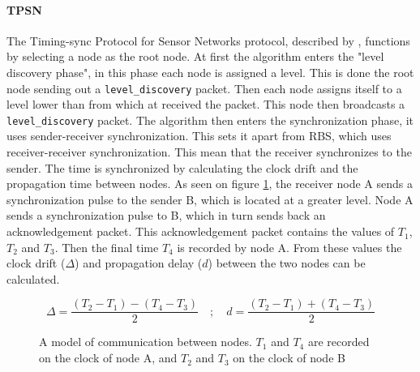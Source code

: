 \documentclass[a4paper,12pt]{article}
\begin{document}
    \paragraph{TPSN} The Timing-sync Protocol for Sensor Networks protocol, described by \citet{GaneriwalEtAl03}, functions by selecting a node as the root node. At first the algorithm enters the "level discovery phase", in this  phase each node is assigned a level. This is done the root node sending out a \texttt{level\_discovery} packet. Then each node assigns itself to a level lower than from which at received the packet. This node then broadcasts a \texttt{level\_discovery} packet. The algorithm then enters the synchronization phase, it uses sender-receiver synchronization. This sets it apart from RBS, which uses receiver-receiver synchronization. This mean that the receiver synchronizes to the sender. The time is synchronized by calculating the clock drift and the propagation time between nodes. As seen on figure \ref{timemeasuretpsn}, the receiver node A sends a synchronization pulse to the sender B, which is located at a greater level. Node A sends a synchronization pulse to B, which in turn sends back an acknowledgement packet. This acknowledgement packet contains the values of $T_1$, $T_2$ and $T_3$. Then the final time $T_4$ is recorded by node A. From these values the clock drift ($\Delta$) and propagation delay ($d$) between the two nodes can be calculated. 
    
    $$\Delta = \frac{(T_2-T_1) - (T_4 - T_3)}{2} \quad ; \quad d = \frac{(T_2-T_1) + (T_4-T_3)}{2}$$
    
    \begin{figure}[H]
        \centering
         \caption{A model of communication between nodes. $T_1$ and $T_4$ are recorded on the clock of node A, and $T_2$ and $T_3$ on the clock of node B}
        \label{timemeasuretpsn}
    \end{figure}
    
\end{document}
